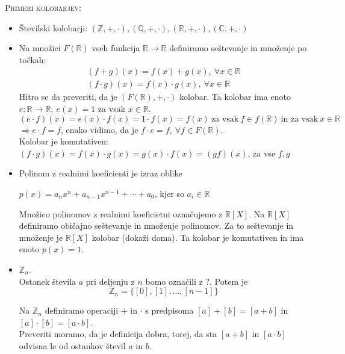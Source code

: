\documentclass[a4paper,12pt]{article}
\begin{document}
\noindent \textsc{Primeri kolobarjev}:
\begin{itemize}
\item Številski kolobarji: $(\mathbb{Z},+,\cdot),(\mathbb{Q},+,\cdot),(\mathbb{R},+,\cdot),(\mathbb{C},+,\cdot)$
\item Na množici $F(\mathbb{R})$ vseh funkcija $\mathbb{R}\to\mathbb{R}$ definiramo seštevanje in množenje po točkah:
\begin{gather*}
(f+g)(x)=f(x)+g(x),~\forall x \in \mathbb{R} \\
(f\cdot g)(x)=f(x)\cdot g(x),~\forall x \in \mathbb{R}
\end{gather*}
Hitro se da preveriti, da je $(F(\mathbb{R}),+,\cdot)$ kolobar. Ta kolobar ima enoto \linebreak $e:\mathbb{R} \to \mathbb{R},~e(x)=1$ za vsak $x\in \mathbb{R}$. 
\begin{equation*}
(e\cdot f)(x)=e(x)\cdot f(x)=1\cdot f(x)=f(x)~\text{za vsak}~f\in f(\mathbb{R})~\text{in za vsak}~x\in \mathbb{R}
\end{equation*}
$\Rightarrow e\cdot f=f$, enako vidimo, da je $f\cdot e=f,~\forall f\in F(\mathbb{R})$. \\

Kolobar je komutativen: $(f\cdot g)(x)=f(x)\cdot g(x)=g(x)\cdot f(x)=(gf)(x)$, za vse $ f,g$

\item Polinom z realnimi koeficienti je izraz oblike 
\begin{center}
$p(x)=a_nx^n+a_{n-1}x^{n-1}+\cdots+a_0$, kjer so $a_i\in \mathbb{R}$
\end{center}
Množico polinomov z realnimi koeficietni označujemo z $\mathbb{R}[X]$. Na $\mathbb{R}[X]$ definiramo običajno seštevanje in množenje polinomov. Za to seštevanje in množenje je $\mathbb{R}[X]$ kolobar (dokaži doma). Ta kolobar je komutativen in ima enoto $p(x)=1$.

\item $\mathbb{Z}_n$. \\

Ostanek števila $a$ pri deljenju z $n$ bomo označili z ?. Potem je \begin{equation*}
\mathbb{Z}_n=\{[0],[1],\ldots,[n-1]\}
\end{equation*}

Na $\mathbb{Z}_n$ definiramo operaciji $+$ in $\cdot$ s predpisoma $[a]+[b]=[a+b]$ in $[a]\cdot[b]=[a\cdot b]$.\\

Preveriti moramo, da je definicija dobra, torej, da sta $[a+b]$ in $[a\cdot b]$ odvisna le od ostankov števil $a$ in $b$.\\


\end{itemize}
\end{document}
